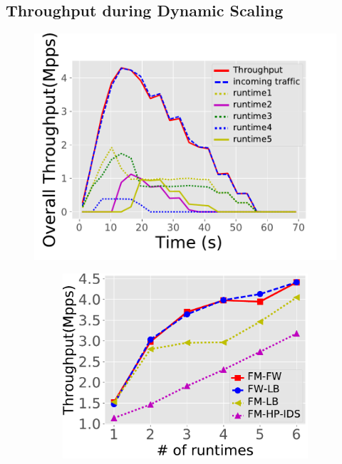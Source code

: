 \subsection{Throughput during Dynamic Scaling}


\begin{figure}[!t]
\captionsetup{width=0.3\textwidth}
\begin{center}
\begin{minipage}[t]{0.355\linewidth}
\includegraphics[width=1\textwidth]{figure/Scale.pdf}
	\caption{Throughput during dynamic scaling.}
\label{fig:normal-case-scale}
\end{minipage}
\hfill
\begin{minipage}[t]{0.615\linewidth}
 \begin{subfigure}[t]{0.48\linewidth}
		\centering
		\includegraphics[width=\columnwidth]{figure/ReplicaTP.pdf}

\end{subfigure}
\end{minipage}
\end{center}
\end{figure}
